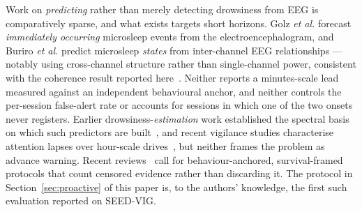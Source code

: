 \documentclass[journal]{IEEEtran}
\DeclareRobustCommand{\add}[1]{#1}                         %
\DeclareRobustCommand{\del}[1]{}                           %
\DeclareRobustCommand{\add}[1]{\hl{#1}}
\DeclareRobustCommand{\del}[1]{{\color{delred}\sout{#1}}\,}
\DeclareRobustCommand{\del}[1]{}                         %
\DeclareRobustCommand{\chg}[2]{\del{#1}\add{#2}}
\begin{document}
\chg{The advance-prediction strand of the literature has been a persistent source of inflated claims. Earlier work reports ``5--10 minute advance window'' figures, but typically against unspecified or per-subject-fitted behavioural thresholds, with no FPR control and dropping subjects where one of the two onsets fails to register.}{Work on \emph{predicting} rather than merely detecting drowsiness from EEG is comparatively sparse, and what exists targets short horizons. Golz \emph{et al.} forecast \emph{immediately occurring} microsleep events from the electroencephalogram, and Buriro \emph{et al.} predict microsleep \emph{states} from inter-channel EEG relationships --- notably using cross-channel structure rather than single-channel power, consistent with the coherence result reported here}~\add{\mbox{\cite{golz2016microsleep,buriro2018microsleep}}}\add{. Neither reports a minutes-scale lead measured against an independent behavioural anchor, and neither controls the per-session false-alert rate or accounts for sessions in which one of the two onsets never registers. Earlier drowsiness-\emph{estimation} work established the spectral basis on which such predictors are built~\mbox{\cite{lin2005drowsiness}}, and recent vigilance studies characterise attention lapses over hour-scale drives~\mbox{\cite{ladouce2025vigilance}}, but neither frames the problem as advance warning.} Recent reviews~\cite{stancin2021review,balam2024review} call for behaviour-anchored, survival-framed protocols that count censored evidence rather than discarding it. The protocol in Section~\ref{sec:proactive} of this paper is, to the authors' knowledge, the first such evaluation reported on SEED-VIG.
\end{document}
